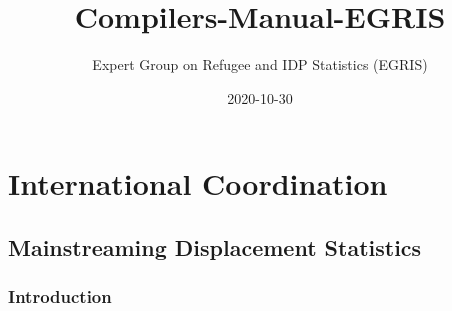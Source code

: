 \documentclass[
]{article}
\title{Compilers-Manual-EGRIS}
\author{Expert Group on Refugee and IDP Statistics (EGRIS)}
\date{2020-10-30}
\begin{document}
\maketitle

{
\setcounter{tocdepth}{2}
\tableofcontents
}
\hypertarget{international-coordination}{%
\section{International Coordination}\label{international-coordination}}

\hypertarget{mainstreaming-displacement-statistics}{%
\subsection{Mainstreaming Displacement Statistics}\label{mainstreaming-displacement-statistics}}

\hypertarget{introduction}{%
\subsubsection{Introduction}\label{introduction}}
\end{document}
